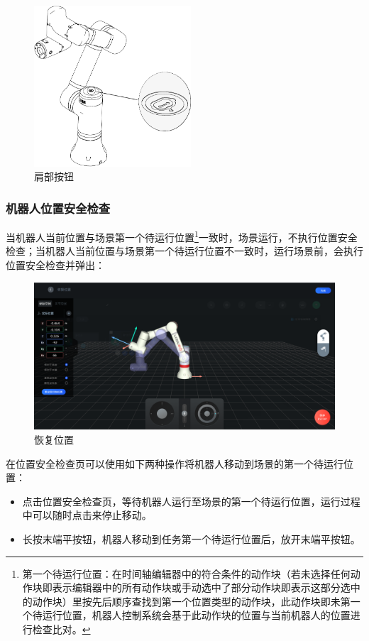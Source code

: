 \begin{figure}[ht]
	\centering
	\includegraphics[height=6cm]{line_graphs/shoulder_btn.pdf}
	\caption{肩部按钮}
	\label{fig:肩部按钮示意图}
\end{figure}

\subsubsection{机器人位置安全检查}
当机器人当前位置与场景第一个待运行位置\footnote{第一个待运行位置：在时间轴编辑器中的符合条件的动作块（若未选择任何动作块即表示编辑器中的所有动作块或手动选中了部分动作块即表示这部分选中的动作块）里按先后顺序查找到第一个位置类型的动作块，此动作块即未第一个待运行位置，机器人控制系统会基于此动作块的位置与当前机器人的位置进行检查比对。}一致时，场景运行，不执行位置安全检查；当机器人当前位置与场景第一个待运行位置不一致时，运行场景前，会执行位置安全检查并弹出：

\begin{figure}[ht]
	\centering
	\includegraphics[width=\textwidth]{screen/3-17.png}
	\caption{恢复位置}
	\label{fig:位置安全检查页}
\end{figure}

在位置安全检查页可以使用如下两种操作将机器人移动到场景的第一个待运行位置：
\begin{itemize}
	\item 点击位置安全检查页，等待机器人运行至场景的第一个待运行位置，运行过程中可以随时点击来停止移动。
	\item 长按末端平按钮，机器人移动到任务第一个待运行位置后，放开末端平按钮。
\end{itemize}

